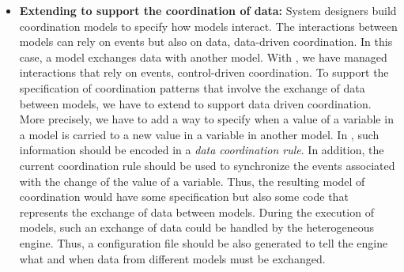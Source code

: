 \begin{itemize}
	\item \textbf{Extending \bcool to support the coordination of data:} System designers build coordination models to specify how models interact. The interactions between models can rely on events but also on data, \ie data-driven coordination. In this case, a model exchanges data with another model. With \bcool, we have managed interactions that rely on events, \ie control-driven coordination. To support the specification of coordination patterns that involve the exchange of data between models, we have to extend \bcool to support data driven coordination. More precisely, we have to add a way to specify when a value of a variable in a model is carried to a new value in a variable in another model. 
	In \bcool, such information should be encoded in a \emph{data coordination rule}. In addition, the current coordination rule should be used to synchronize the events associated with the change of the value of a variable. Thus, the resulting model of coordination would have some \ccsl specification but also some code that represents the exchange of data between models. During the execution of models, such an exchange of data could be handled by the heterogeneous engine. Thus, a configuration file should be also generated to tell the engine what and when data from different models must be exchanged.	
	   	 

\end{itemize}
